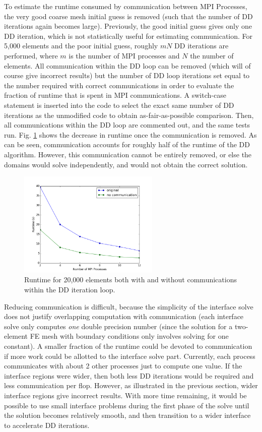 \documentclass[10pt]{article}
\begin{document}
To estimate the runtime consumed by communication between MPI Processes, the very good coarse mesh initial guess is removed (such that the number of DD iterations again becomes large). Previously, the good initial guess gives only one DD iteration, which is not statistically useful for estimating communication. For 5,000 elements and the poor initial guess, roughly \(mN\) DD iterations are performed, where \(m\) is the number of MPI processes and \(N\) the number of elements. All communication within the DD loop can be removed (which will of course give incorrect results) but the number of DD loop iterations set equal to the number required with correct communications in order to evaluate the fraction of runtime that is spent in MPI communications. A switch-case statement is inserted into the code to select the exact same number of DD iterations as the unmodified code to obtain as-fair-as-possible comparison. Then, all communications within the DD loop are commented out, and the same tests run. Fig. \ref{fig:nocomm} shows the decrease in runtime once the communication is removed. As can be seen, communication accounts for roughly half of the runtime of the DD algorithm. However, this communication cannot be entirely removed, or else the domains would solve independently, and would not obtain the correct solution. 

\begin{figure}[H]
\centering
\includegraphics[width=0.6\textwidth]{../figures/nocomm.png}
\caption{Runtime for 20,000 elements both with and without communications within the DD iteration loop.}
\label{fig:nocomm}
\end{figure}

Reducing communication is difficult, because the simplicity of the interface solve does not justify overlapping computation with communication (each interface solve only computes {\it one} double precision number (since the solution for a two-element FE mesh with boundary conditions only involves solving for one constant). A smaller fraction of the runtime could be devoted to communication if more work could be allotted to the interface solve part. Currently, each process communicates with about 2 other processes just to compute one value. If the interface regions were wider, then both less DD iterations would be required and less communication per flop. However, as illustrated in the previous section, wider interface regions give incorrect results. With more time remaining, it would be possible to use small interface problems during the first phase of the solve until the solution becomes relatively smooth, and then transition to a wider interface to accelerate DD iterations. 
\end{document}
